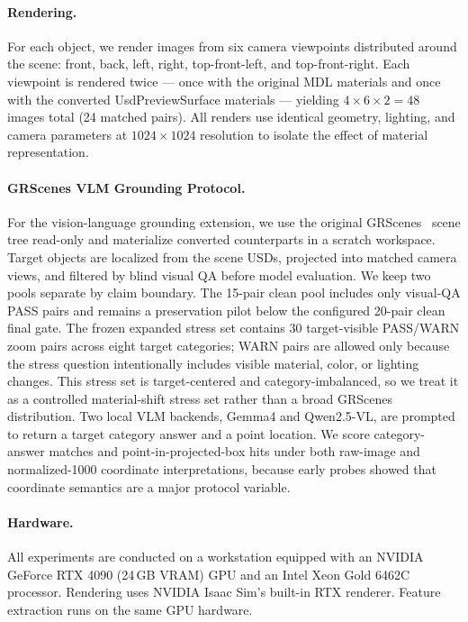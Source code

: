\paragraph{Rendering.}
For each object, we render images from six camera viewpoints distributed around
the scene: front, back, left, right, top-front-left, and top-front-right.
Each viewpoint is rendered twice --- once with the original MDL materials and
once with the converted UsdPreviewSurface materials --- yielding $4 \times 6
\times 2 = 48$ images total (24 matched pairs). All renders use identical
geometry, lighting, and camera parameters at $1024 \times 1024$ resolution to
isolate the effect of material representation.

\paragraph{GRScenes VLM Grounding Protocol.}
For the vision-language grounding extension, we use the original
GRScenes~\cite{Wang2024GRUtopia} scene tree read-only and materialize
converted counterparts in a scratch workspace.
Target objects are localized from the scene USDs, projected into matched camera
views, and filtered by blind visual QA before model evaluation. We keep two
pools separate by claim boundary. The 15-pair clean pool includes only
visual-QA PASS pairs and remains a preservation pilot below the configured
20-pair clean final gate. The frozen expanded stress set contains 30
target-visible PASS/WARN zoom pairs across eight target categories; WARN pairs
are allowed only because the stress question intentionally includes visible
material, color, or lighting changes. This stress set is target-centered and
category-imbalanced, so we treat it as a controlled material-shift stress set
rather than a broad GRScenes distribution. Two local VLM backends, Gemma4 and
Qwen2.5-VL, are prompted to return a target category answer and a point
location. We score category-answer matches and point-in-projected-box hits
under both raw-image and normalized-1000 coordinate interpretations, because
early probes showed that coordinate semantics are a major protocol variable.

\paragraph{Hardware.}
All experiments are conducted on a workstation equipped with an NVIDIA GeForce
RTX 4090 (24\,GB VRAM) GPU and an Intel Xeon Gold 6462C processor. Rendering uses NVIDIA Isaac Sim's
built-in RTX renderer. Feature extraction runs on the same GPU hardware.


